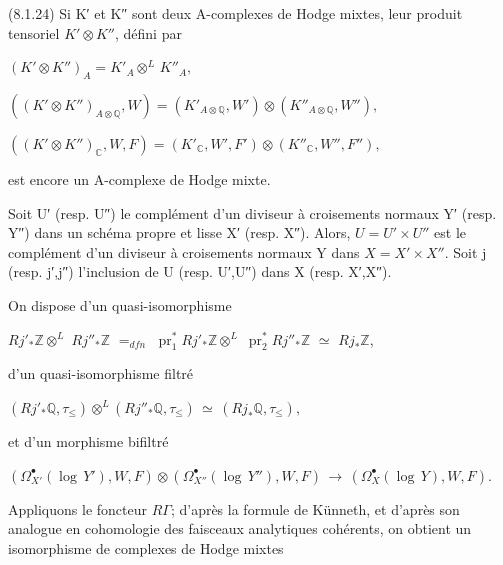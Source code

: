 \documentclass[11pt,twoside]{article}
\newcommand{\DFormula}[1]{%
  \par\smallskip\noindent\hspace*{0pt}\(\displaystyle #1\)\par\smallskip
}
\begin{document}
(8.1.24) Si K′ et K″ sont deux A-complexes de Hodge mixtes, leur produit tensoriel \(K′\otimes K″\), défini par\par
\par\medskip
\DFormula{(K′\otimes K″)_{A}=K′_{A}\otimes ^{L}\,K″_{A},}
\par\medskip
\DFormula{((K′\otimes K″)_{A\otimes \mathbb{Q}},W)=(K′_{A\otimes \mathbb{Q}},W′)\otimes (K″_{A\otimes \mathbb{Q}},W″),}
\par\medskip
\DFormula{((K′\otimes K″)_{\mathbb{C}},W,F)=(K′_{\mathbb{C}},W′,F′)\otimes (K″_{\mathbb{C}},W″,F″),}
\par\medskip
est encore un A-complexe de Hodge mixte.\par
\par\medskip
Soit U′ (resp. U″) le complément d’un diviseur à croisements normaux Y′ (resp. Y″) dans un schéma propre et lisse X′ (resp. X″). Alors, \(U=U′\times U″\) est le complément d’un diviseur à croisements normaux Y dans \(X=X′\times X″\). Soit j (resp. j′,j″) l’inclusion de U (resp. U′,U″) dans X (resp. X′,X″).\par
\par\medskip
On dispose d’un quasi-isomorphisme\par
\par\medskip
\(Rj′_{\ast }\mathbb{Z}\otimes ^{L}\) \(Rj″_{\ast }\mathbb{Z}\) \(=_{dfn}\) \(\operatorname{pr}_{1}^{\ast }Rj′_{\ast }\mathbb{Z}\otimes ^{L}\) \(\operatorname{pr}_{2}^{\ast }Rj″_{\ast }\mathbb{Z}\) \(\simeq \) \(Rj_{\ast }\mathbb{Z}\),\par
\par\medskip
d’un quasi-isomorphisme filtré\par
\par\medskip
\DFormula{(Rj′_{\ast }\mathbb{Q},\tau _{\leq })\otimes ^{L}(Rj″_{\ast }\mathbb{Q},\tau _{\leq })\,\simeq \,(Rj_{\ast }\mathbb{Q},\tau _{\leq }),}
\par\medskip
et d’un morphisme bifiltré\par
\par\medskip
\DFormula{(\Omega _{X′}^{\bullet }(\operatorname{log}\,Y′),W,F)\otimes (\Omega _{X″}^{\bullet }(\operatorname{log}\,Y″),W,F)\,\to \,(\Omega _{X}^{\bullet }(\operatorname{log}\,Y),W,F).}
\par\medskip
Appliquons le foncteur \(R\Gamma \); d’après la formule de Künneth, et d’après son analogue en cohomologie des faisceaux analytiques cohérents, on obtient un isomorphisme de complexes de Hodge mixtes\par
\par\medskip
\end{document}
